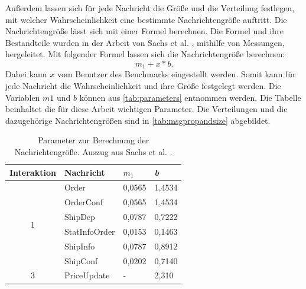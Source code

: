 Außerdem lassen sich für jede Nachricht die Größe und die Verteilung festlegen, mit welcher Wahrscheinlichkeit eine bestimmte Nachrichtengröße auftritt. Die Nachrichtengröße lässt sich mit einer Formel berechnen. Die Formel und ihre Bestandteile wurden in der Arbeit von Sachs et al. \cite{Sachs2013}, mithilfe von Messungen, hergeleitet. Mit folgender Formel lassen sich die Nachrichtengröße berechnen: 
\[m_1 + x * b .\] 
Dabei kann $x$ vom Benutzer des Benchmarks eingestellt werden. Somit kann für jede Nachricht die Wahrscheinlichkeit und ihre Größe festgelegt werden. Die Variablen $m1$ und $b$ können aus \autoref{tab:parameters} entnommen werden. Die Tabelle beinhaltet die für diese Arbeit wichtigen Parameter. Die Verteilungen und die dazugehörige Nachrichtengrößen sind in \autoref{tab:msgpropandsize} abgebildet.


\begin{table}
\center
  \begin{tabular}{|c|l|l|l|}
  \hline
    \textbf{Interaktion} & \textbf{Nachricht} & \textit{\(m_1\)} & \textit{b}  \\
    \hline \hline
    \multirow{6}{*}{1} & Order & 0,0565 & 1,4534 \\\cline{2-4}
    & OrderConf & 0,0565 & 1,4534 \\\cline{2-4}
    & ShipDep & 0,0787 & 0,7222 \\\cline{2-4}
    & StatInfoOrder & 0,0153 & 0,1463 \\\cline{2-4}
    & ShipInfo & 0,0787 & 0,8912 \\\cline{2-4}
    & ShipConf & 0,0202 & 0,7140  \\\hline
    \hline
     3 & PriceUpdate & - & 2,310 \\\hline
  \end{tabular}
	\caption{\label{tab:parameters} Parameter zur Berechnung der Nachrichtengröße. Auszug aus Sachs et al. \cite{Sachs2013}.}
\end{table}

